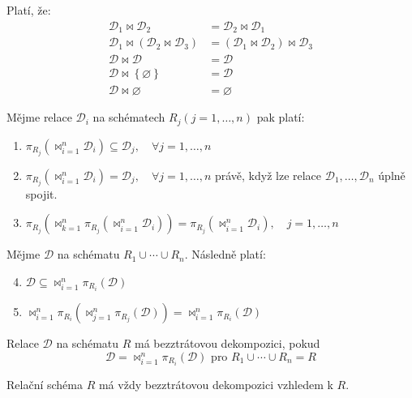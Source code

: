 \begin{upquote}
Platí, že:
\begin{align}
\tag{Komutativita}\mathcal{D}_{1} \Join \mathcal{D}_{2} &= \mathcal{D}_{2} \Join \mathcal{D}_{1} \\
\tag{Asociativita}\mathcal{D}_{1} \Join (\mathcal{D}_{2} \Join \mathcal{D}_{3}) &= (\mathcal{D}_{1} \Join \mathcal{D}_{2}) \Join \mathcal{D}_{3} \\
\tag{Idempotence}\mathcal{D} \Join \mathcal{D} &= \mathcal{D} \\
\tag{Neutralita vůči množině obs. $\varnothing$}\mathcal{D} \Join \left\{ \varnothing \right\} &= \mathcal{D} \\
\tag{Anihilace vůči prázdné množině}\mathcal{D} \Join \varnothing &= \varnothing
\end{align}
\end{upquote}
\begin{upquote}
Mějme relace $\mathcal{D}_{i}$ na schématech $R_{j} (j=1, \dots , n)$ pak platí:
\begin{enumerate}
\item $\pi_{R_{j}} (\Join_{i = 1}^{n} \mathcal{D}_{i}) \subseteq \mathcal{D}_{j}, \quad \forall j = 1, \ldots, n$
\item $\pi_{R_{j}} (\Join_{i = 1}^{n} \mathcal{D}_{i}) = \mathcal{D}_{j}, \quad \forall j = 1, \ldots, n$ právě, když lze relace $\mathcal{D}_{1}, \ldots, \mathcal{D}_{n}$ úplně spojit.
\item $\pi_{R_{j}} (\Join_{k = 1}^{n} \pi_{R_{j}} (\Join_{i = 1}^{n} \mathcal{D}_{i})) = \pi_{R_{j}} (\Join_{i = 1}^{n} \mathcal{D}_{i}), \quad j = 1, \ldots, n$
\end{enumerate}
Mějme $\mathcal{D}$ na schématu $R_{1} \cup \cdots \cup R_{n}$. Následně platí:
\begin{enumerate}
\setcounter{enumi}{3}
\item $\mathcal{D} \subseteq \Join_{i = 1}^{n} \pi_{R_{i}} (\mathcal{D})$
\item $\Join_{i = 1}^{n} \pi_{R_{i}} (\Join_{j = 1}^{n} \pi_{R_{j}} (\mathcal{D})) = \Join_{i = 1}^{n} \pi_{R_{i}} (\mathcal{D}) $
\end{enumerate}
\end{upquote}
\begin{uptheorem}
Relace $\mathcal{D}$ na schématu $R$ má bezztrátovou dekompozici, pokud
$$
\mathcal{D} = \Join_{i = 1}^{n} \pi_{R_{i}} (\mathcal{D}) \text{ pro } R_{1} \cup \cdots \cup R_{n} = R
$$
\end{uptheorem}
\begin{upnote}
Relační schéma $R$ má vždy bezztrátovou dekompozici vzhledem k $R$.
\end{upnote}

